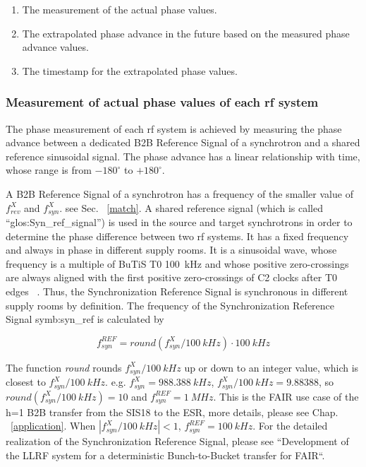\begin{enumerate}
\item The measurement of the actual phase values.
\item The extrapolated phase advance in the future based on the measured phase advance values.
\item The timestamp for the extrapolated phase values.
\end{enumerate}
 \subsubsection{Measurement of actual phase values of each rf system}
The phase measurement of each rf system is achieved by measuring the phase advance between a dedicated B2B Reference Signal of a synchrotron and a shared reference sinusoidal signal. The phase advance has a linear relationship with time, whose range is from $-180^\circ$ to $+180^\circ$. 


A B2B Reference Signal of a synchrotron has a frequency of the smaller value of $f_{\mathit{rev}}^{X}$ and $f_{\mathit{syn}}^{X}$. see Sec. ~\ref{match}. A shared reference signal (which is called “\gls{glos:Syn_ref_signal}”) is used in the source and target synchrotrons in order to determine the phase difference between two rf systems. It has a fixed frequency and always in phase in different supply rooms. It is a sinusoidal wave, whose frequency is a multiple of BuTiS T0 \SI{100}{kHz} and whose positive zero-crossings are always aligned with the first positive zero-crossings of C2 clocks after T0 edges ~\cite{ferrand_system_2014, ferrand_system_2015}. Thus, the Synchronization Reference Signal is synchronous in different supply rooms by definition. The frequency of the Synchronization Reference Signal \gls{symb:syn_ref} is calculated by 

\begin{equation}
\label{round}
	f_\mathit{syn}^\mathit{REF}=\textit{round} (f_\mathit{syn}^{X}/\SI{100}{kHz})\cdot \SI{100}{kHz}
\end{equation}

The function \textit{round} rounds $f_\mathit{syn}^{X}/\SI{100}{kHz}$ up or down to an integer value, which is closest to $f_\mathit{syn}^{X}/\SI{100}{kHz}$. e.g. $f_\mathit{syn}^{X}=\SI{988.388}{kHz}$, $f_\mathit{syn}^{X}/\SI{100}{kHz}=9.88388$, so $\textit{round} (f_\mathit{syn}^{X}/\SI{100}{kHz})=10$ and $f_\mathit{syn}^\mathit{REF}=\SI{1}{MHz}$. This is the FAIR use case of the h=1 B2B transfer from the SIS18 to the ESR, more details, please see Chap. ~\ref{application}. When $|f_\mathit{syn}^{X}/\SI{100}{kHz}|<1$, $f_\mathit{syn}^\mathit{REF}=\SI{100}{kHz}$.  For the detailed realization of the Synchronization Reference Signal, please see ``Development of the LLRF system for a deterministic Bunch-to-Bucket transfer for FAIR``.

